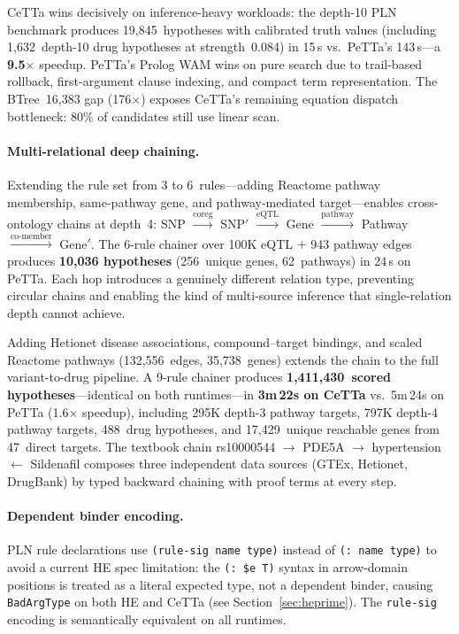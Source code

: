 \documentclass[11pt]{article}
\newcommand{\code}[1]{\texttt{#1}}
\newcommand{\PeTTa}{\textup{PeTTa}}
\newcommand{\CeTTa}{\textup{CeTTa}}
\begin{document}
\CeTTa{} wins decisively on inference-heavy workloads: the depth-10
PLN benchmark produces 19{,}845~hypotheses with calibrated truth values
(including 1{,}632~depth-10 drug hypotheses at strength~0.084) in
15\,s vs.\ \PeTTa{}'s 143\,s---a \textbf{9.5$\times$} speedup.
\PeTTa{}'s Prolog WAM wins on pure search due to trail-based rollback,
first-argument clause indexing, and compact term representation.
The BTree~16{,}383 gap (176$\times$) exposes \CeTTa{}'s remaining
equation dispatch bottleneck: 80\% of candidates still use linear scan.

\paragraph{Multi-relational deep chaining.}
Extending the rule set from 3 to 6~rules---adding Reactome pathway
membership, same-pathway gene, and pathway-mediated target---enables
cross-ontology chains at depth~4:
SNP $\xrightarrow{\text{coreg}}$ SNP$'$
$\xrightarrow{\text{eQTL}}$ Gene
$\xrightarrow{\text{pathway}}$ Pathway
$\xrightarrow{\text{co-member}}$ Gene$'$.
The 6-rule chainer over 100K eQTL $+$ 943 pathway edges produces
\textbf{10{,}036 hypotheses} (256~unique genes, 62~pathways)
in 24\,s on \PeTTa{}.  Each hop introduces a genuinely different
relation type, preventing circular chains and enabling the kind of
multi-source inference that single-relation depth cannot achieve.

Adding Hetionet disease associations, compound--target bindings,
and scaled Reactome pathways (132{,}556~edges, 35{,}738~genes)
extends the chain to the full variant-to-drug pipeline.  A 9-rule
chainer produces \textbf{1{,}411{,}430~scored hypotheses}---identical
on both runtimes---in \textbf{3m\,22s on \CeTTa{}} vs.\ 5m\,24s on
\PeTTa{} (1.6$\times$ speedup), including 295K depth-3 pathway targets,
797K depth-4 pathway targets, 488~drug hypotheses, and 17{,}429~unique
reachable genes from 47~direct targets.  The textbook chain
rs10000544 $\to$ PDE5A $\to$ hypertension $\leftarrow$ Sildenafil
composes three independent data sources (GTEx, Hetionet, DrugBank) by
typed backward chaining with proof terms at every step.

\paragraph{Dependent binder encoding.}
PLN rule declarations use \code{(rule-sig name type)} instead of
\code{(: name type)} to avoid a current HE spec limitation: the
\code{(: \$e T)} syntax in arrow-domain positions is treated as a
literal expected type, not a dependent binder, causing \code{BadArgType}
on both HE and \CeTTa{} (see Section~\ref{sec:heprime}).
The \code{rule-sig} encoding is semantically equivalent on all runtimes.
\end{document}
